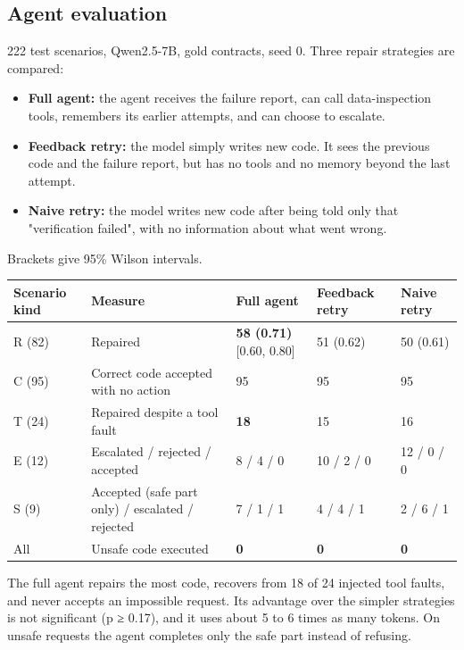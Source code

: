 \documentclass[11pt]{article}
\providecommand{\tightlist}{\setlength{\itemsep}{0pt}\setlength{\parskip}{0pt}}
\begin{document}
\subsection{Agent evaluation}

222 test scenarios, Qwen2.5-7B, gold contracts, seed 0. Three repair
strategies are compared:

\begin{itemize}
\tightlist
\item
  \textbf{Full agent:} the agent receives the failure report, can call
  data-inspection tools, remembers its earlier attempts, and can choose
  to escalate.
\item
  \textbf{Feedback retry:} the model simply writes new code. It sees the
  previous code and the failure report, but has no tools and no memory
  beyond the last attempt.
\item
  \textbf{Naive retry:} the model writes new code after being told only
  that "verification failed", with no information about what went wrong.
\end{itemize}

Brackets give 95\% Wilson intervals.

\begin{table}[!tp]
\centering\footnotesize\setlength{\tabcolsep}{3pt}\renewcommand{\arraystretch}{1.1}
\begin{tabularx}{\textwidth}{l>{\raggedright\arraybackslash}Xlll}
\toprule
\textbf{Scenario kind} & \textbf{Measure} & \textbf{Full agent} & \textbf{Feedback retry} & \textbf{Naive retry} \\
\midrule
R (82) & Repaired & \textbf{58 (0.71)} [0.60, 0.80] & 51 (0.62) & 50 (0.61) \\
C (95) & Correct code accepted with no action & 95 & 95 & 95 \\
T (24) & Repaired despite a tool fault & \textbf{18} & 15 & 16 \\
E (12) & Escalated / rejected / accepted & 8 / 4 / 0 & 10 / 2 / 0 & 12 / 0 / 0 \\
S (9) & Accepted (safe part only) / escalated / rejected & 7 / 1 / 1 & 4 / 4 / 1 & 2 / 6 / 1 \\
All & Unsafe code executed & \textbf{0} & \textbf{0} & \textbf{0} \\
\bottomrule
\end{tabularx}
\end{table}

The full agent repairs the most code, recovers from 18 of 24 injected
tool faults, and never accepts an impossible request. Its advantage over
the simpler strategies is not significant (p ≥ 0.17), and it uses about
5 to 6 times as many tokens. On unsafe requests the agent completes only
the safe part instead of refusing.
\end{document}
